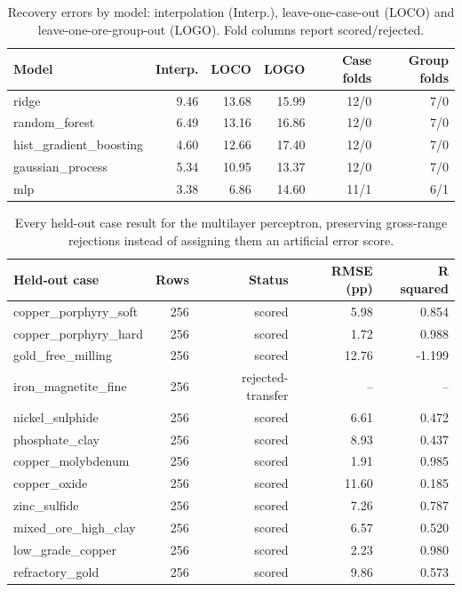 \begin{table}[htbp]
\centering
\small
\caption{Recovery errors by model: interpolation (Interp.), leave-one-case-out (LOCO) and leave-one-ore-group-out (LOGO). Fold columns report scored/rejected.}
\label{tab:learning-summary}
\begin{tabular}{lrrrrr}
\toprule
Model & Interp. & LOCO & LOGO & Case folds & Group folds \\
\midrule
ridge & 9.46 & 13.68 & 15.99 & 12/0 & 7/0 \\
random\_forest & 6.49 & 13.16 & 16.86 & 12/0 & 7/0 \\
hist\_gradient\_boosting & 4.60 & 12.66 & 17.40 & 12/0 & 7/0 \\
gaussian\_process & 5.34 & 10.95 & 13.37 & 12/0 & 7/0 \\
mlp & 3.38 & 6.86 & 14.60 & 11/1 & 6/1 \\
\bottomrule
\end{tabular}
\end{table}
\begin{table}[htbp]
\centering
\small
\caption{Every held-out case result for the multilayer perceptron, preserving gross-range rejections instead of assigning them an artificial error score.}
\label{tab:transfer-folds}
\begin{tabular}{lrrrr}
\toprule
Held-out case & Rows & Status & RMSE (pp) & R squared \\
\midrule
copper\_porphyry\_soft & 256 & scored & 5.98 & 0.854 \\
copper\_porphyry\_hard & 256 & scored & 1.72 & 0.988 \\
gold\_free\_milling & 256 & scored & 12.76 & -1.199 \\
iron\_magnetite\_fine & 256 & rejected-transfer & -- & -- \\
nickel\_sulphide & 256 & scored & 6.61 & 0.472 \\
phosphate\_clay & 256 & scored & 8.93 & 0.437 \\
copper\_molybdenum & 256 & scored & 1.91 & 0.985 \\
copper\_oxide & 256 & scored & 11.60 & 0.185 \\
zinc\_sulfide & 256 & scored & 7.26 & 0.787 \\
mixed\_ore\_high\_clay & 256 & scored & 6.57 & 0.520 \\
low\_grade\_copper & 256 & scored & 2.23 & 0.980 \\
refractory\_gold & 256 & scored & 9.86 & 0.573 \\
\bottomrule
\end{tabular}
\end{table}
